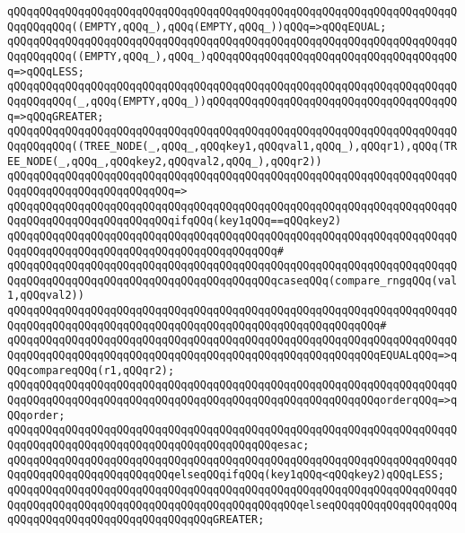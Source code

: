 \verb|qQQqqQQqqQQqqQQqqQQqqQQqqQQqqQQqqQQqqQQqqQQqqQQqqQQqqQQqqQQqqQQqqQQqqQQqqQQqqQQq((EMPTY,qQQq_),qQQq(EMPTY,qQQq_))qQQq=>qQQqEQUAL;|\newline
\verb|qQQqqQQqqQQqqQQqqQQqqQQqqQQqqQQqqQQqqQQqqQQqqQQqqQQqqQQqqQQqqQQqqQQqqQQqqQQqqQQq((EMPTY,qQQq_),qQQq_)qQQqqQQqqQQqqQQqqQQqqQQqqQQqqQQqqQQqqQQq=>qQQqLESS;|\newline
\verb|qQQqqQQqqQQqqQQqqQQqqQQqqQQqqQQqqQQqqQQqqQQqqQQqqQQqqQQqqQQqqQQqqQQqqQQqqQQqqQQq(_,qQQq(EMPTY,qQQq_))qQQqqQQqqQQqqQQqqQQqqQQqqQQqqQQqqQQqqQQq=>qQQqGREATER;|\newline
\newline
\verb|qQQqqQQqqQQqqQQqqQQqqQQqqQQqqQQqqQQqqQQqqQQqqQQqqQQqqQQqqQQqqQQqqQQqqQQqqQQqqQQq((TREE_NODE(_,qQQq_,qQQqkey1,qQQqval1,qQQq_),qQQqr1),qQQq(TREE_NODE(_,qQQq_,qQQqkey2,qQQqval2,qQQq_),qQQqr2))|\newline
\verb|qQQqqQQqqQQqqQQqqQQqqQQqqQQqqQQqqQQqqQQqqQQqqQQqqQQqqQQqqQQqqQQqqQQqqQQqqQQqqQQqqQQqqQQqqQQqqQQq=>|\newline
\verb|qQQqqQQqqQQqqQQqqQQqqQQqqQQqqQQqqQQqqQQqqQQqqQQqqQQqqQQqqQQqqQQqqQQqqQQqqQQqqQQqqQQqqQQqqQQqqQQqifqQQq(key1qQQq==qQQqkey2)|\newline
\verb|qQQqqQQqqQQqqQQqqQQqqQQqqQQqqQQqqQQqqQQqqQQqqQQqqQQqqQQqqQQqqQQqqQQqqQQqqQQqqQQqqQQqqQQqqQQqqQQqqQQqqQQqqQQqqQQq#|\newline
\verb|qQQqqQQqqQQqqQQqqQQqqQQqqQQqqQQqqQQqqQQqqQQqqQQqqQQqqQQqqQQqqQQqqQQqqQQqqQQqqQQqqQQqqQQqqQQqqQQqqQQqqQQqqQQqqQQqcaseqQQq(compare_rngqQQq(val1,qQQqval2))|\newline
\verb|qQQqqQQqqQQqqQQqqQQqqQQqqQQqqQQqqQQqqQQqqQQqqQQqqQQqqQQqqQQqqQQqqQQqqQQqqQQqqQQqqQQqqQQqqQQqqQQqqQQqqQQqqQQqqQQqqQQqqQQqqQQqqQQq#|\newline
\verb|qQQqqQQqqQQqqQQqqQQqqQQqqQQqqQQqqQQqqQQqqQQqqQQqqQQqqQQqqQQqqQQqqQQqqQQqqQQqqQQqqQQqqQQqqQQqqQQqqQQqqQQqqQQqqQQqqQQqqQQqqQQqqQQqEQUALqQQq=>qQQqcompareqQQq(r1,qQQqr2);|\newline
\verb|qQQqqQQqqQQqqQQqqQQqqQQqqQQqqQQqqQQqqQQqqQQqqQQqqQQqqQQqqQQqqQQqqQQqqQQqqQQqqQQqqQQqqQQqqQQqqQQqqQQqqQQqqQQqqQQqqQQqqQQqqQQqqQQqorderqQQq=>qQQqorder;|\newline
\verb|qQQqqQQqqQQqqQQqqQQqqQQqqQQqqQQqqQQqqQQqqQQqqQQqqQQqqQQqqQQqqQQqqQQqqQQqqQQqqQQqqQQqqQQqqQQqqQQqqQQqqQQqqQQqqQQqesac;|\newline
\verb|qQQqqQQqqQQqqQQqqQQqqQQqqQQqqQQqqQQqqQQqqQQqqQQqqQQqqQQqqQQqqQQqqQQqqQQqqQQqqQQqqQQqqQQqqQQqqQQqelseqQQqifqQQq(key1qQQq<qQQqkey2)qQQqLESS;|\newline
\verb|qQQqqQQqqQQqqQQqqQQqqQQqqQQqqQQqqQQqqQQqqQQqqQQqqQQqqQQqqQQqqQQqqQQqqQQqqQQqqQQqqQQqqQQqqQQqqQQqqQQqqQQqqQQqqQQqqQQqelseqQQqqQQqqQQqqQQqqQQqqQQqqQQqqQQqqQQqqQQqqQQqqQQqqQQqGREATER;|\newline
